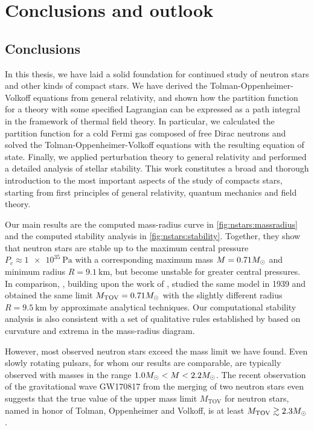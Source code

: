 \chapter{Conclusions and outlook}
\label{chap:conclusion}

\section{Conclusions}

In this thesis, we have laid a solid foundation for continued study of neutron stars and other kinds of compact stars.
We have derived the Tolman-Oppenheimer-Volkoff equations from general relativity, and shown how the partition function for a theory with some specified Lagrangian can be expressed as a path integral in the framework of thermal field theory.
In particular, we calculated the partition function for a cold Fermi gas composed of free Dirac neutrons and solved the Tolman-Oppenheimer-Volkoff equations with the resulting equation of state.
Finally, we applied perturbation theory to general relativity and performed a detailed analysis of stellar stability.
This work constitutes a broad and thorough introduction to the most important aspects of the study of compacts stars, starting from first principles of general relativity, quantum mechanics and field theory.

Our main results are the computed mass-radius curve in \cref{fig:nstars:massradius} and the computed stability analysis in \cref{fig:nstars:stability}.
Together, they show that neutron stars are stable up to the maximum central pressure $P_c \approx \SI{1e35}{\pascal} $ with a corresponding maximum mass $M = 0.71 M_\odot$ and minimum radius $R = \SI{9.1}{\kilo\meter}$, but become unstable for greater central pressures.
In comparison, \cite{ref:tov}, building upon the work of \cite{ref:tolman}, studied the same model in 1939 and obtained the same limit $M_\text{TOV} = 0.71 M_\odot$ with the slightly different radius $R = \SI{9.5}{\kilo\meter}$ by approximate analytical techniques.
Our computational stability analysis is also consistent with a set of qualitative rules established by \cite{ref:stability_methods} based on curvature and extrema in the mass-radius diagram.

However, most observed neutron stars exceed the mass limit we have found.
Even slowly rotating pulsars, for whom our results are comparable, \cite[section 2.1]{ref:neutron_star_physics} are typically observed with masses in the range $1.0 M_\odot < M < 2.2 M_\odot$. \cite[figure 2 and 3]{ref:neutron_star_masses_paper}
The recent observation of the gravitational wave GW170817 from the merging of two neutron stars even suggests that the true value of the upper mass limit $M_\text{TOV}$ for neutron stars, named in honor of Tolman, Oppenheimer and Volkoff, is at least $M_\text{TOV} \gtrsim 2.3 M_\odot$. \cite{ref:gravitational_wave_tov_limit}


